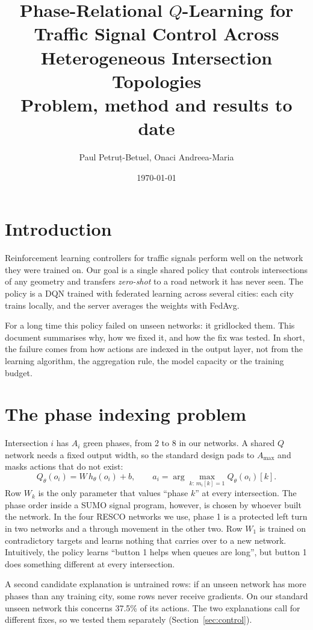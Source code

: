 \documentclass[10pt,twocolumn,a4paper]{article}
\title{\textbf{Phase-Relational \texorpdfstring{$Q$}{Q}-Learning for Traffic Signal
Control Across Heterogeneous Intersection Topologies}\\[4pt]
\large Problem, method and results to date}
\author{Paul Petruț-Betuel, Onaci Andreea-Maria}
\date{\today}
\begin{document}
\maketitle

\section{Introduction}
Reinforcement learning controllers for traffic signals perform well on the network they
were trained on. Our goal is a single shared policy that controls intersections of any
geometry and transfers \emph{zero-shot} to a road network it has never seen. The policy is
a DQN trained with federated learning across several cities: each city trains locally, and
the server averages the weights with FedAvg.

For a long time this policy failed on unseen networks: it gridlocked them. This document
summarises why, how we fixed it, and how the fix was tested. In short, the failure comes
from how actions are indexed in the output layer, not from the learning algorithm, the
aggregation rule, the model capacity or the training budget.

\section{The phase indexing problem}
Intersection $i$ has $A_i$ green phases, from 2 to 8 in our networks. A shared $Q$ network
needs a fixed output width, so the standard design pads to $A_{\max}$ and masks actions that
do not exist:
\[
Q_\theta(o_i)=W\,h_\theta(o_i)+b,\qquad
a_i=\arg\max_{k:\,m_i[k]=1} Q_\theta(o_i)[k].
\]
Row $W_k$ is the only parameter that values ``phase $k$'' at every intersection. The phase
order inside a SUMO signal program, however, is chosen by whoever built the network. In the
four RESCO networks we use, phase 1 is a protected left turn in two networks and a through
movement in the other two. Row $W_1$ is trained on contradictory targets and learns nothing
that carries over to a new network. Intuitively, the policy learns ``button 1 helps when
queues are long'', but button 1 does something different at every intersection.

A second candidate explanation is untrained rows: if an unseen network has more phases than
any training city, some rows never receive gradients. On our standard unseen network this
concerns 37.5\% of its actions. The two explanations call for different fixes, so we tested
them separately (Section~\ref{sec:control}).
\end{document}
